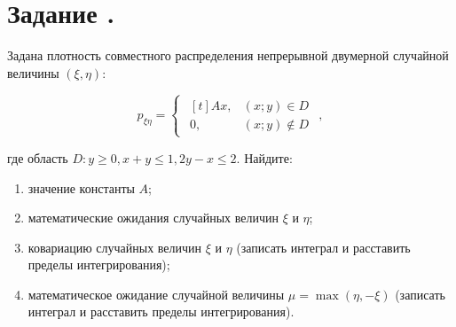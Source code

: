 \documentclass[12pt]{article}
\begin{document}
\section*{Задание .}

Задана плотность совместного распределения непрерывной двумерной случайной величины $(\xi, \eta)$:

\begin{equation*}
	p_{\xi\eta} =
	\begin{cases}
		\begin{aligned}[t]
			Ax, & (x;y) \in D    \\
			0,  & (x;y) \notin D
		\end{aligned}
	\end{cases},
\end{equation*}

где область $D\!: y \geq 0, x + y \leq 1,  2y - x \leq 2$.
Найдите:

\begin{enumerate}
	\item значение константы $A$;
	\item математические ожидания случайных величин $\xi$ и $\eta$;
	\item ковариацию случайных величин $\xi$ и $\eta$ (записать интеграл и расставить пределы интегрирования);
	\item математическое ожидание случайной величины $\mu = \max(\eta, -\xi)$ (записать интеграл и расставить пределы интегрирования).
\end{enumerate}

\end{document}
